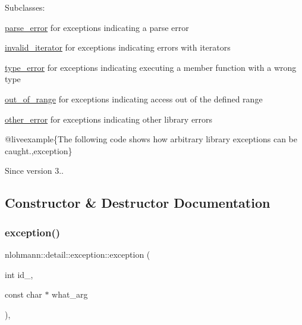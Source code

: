 Subclasses\+:
\begin{DoxyItemize}
\item \mbox{\hyperlink{classnlohmann_1_1detail_1_1parse__error}{parse\+\_\+error}} for exceptions indicating a parse error
\item \mbox{\hyperlink{classnlohmann_1_1detail_1_1invalid__iterator}{invalid\+\_\+iterator}} for exceptions indicating errors with iterators
\item \mbox{\hyperlink{classnlohmann_1_1detail_1_1type__error}{type\+\_\+error}} for exceptions indicating executing a member function with a wrong type
\item \mbox{\hyperlink{classnlohmann_1_1detail_1_1out__of__range}{out\+\_\+of\+\_\+range}} for exceptions indicating access out of the defined range
\item \mbox{\hyperlink{classnlohmann_1_1detail_1_1other__error}{other\+\_\+error}} for exceptions indicating other library errors
\end{DoxyItemize}

@liveexample\{The following code shows how arbitrary library exceptions can be caught.,exception\}

\begin{DoxySince}{Since}
version 3.. 
\end{DoxySince}


\subsection{Constructor \& Destructor Documentation}
\mbox{\label{classnlohmann_1_1detail_1_1exception_ae323ad0d53bc724414c2233164e65657}} 
\subsubsection{\texorpdfstring{exception()}{exception()}}
{\footnotesize\ttfamily nlohmann\+::detail\+::exception\+::exception (\begin{DoxyParamCaption}\item[{int}]{id\+\_\+,  }\item[{const char $\ast$}]{what\+\_\+arg }\end{DoxyParamCaption})\hspace{0.3cm}{\ttfamily [inline]}, {\ttfamily [protected]}}



